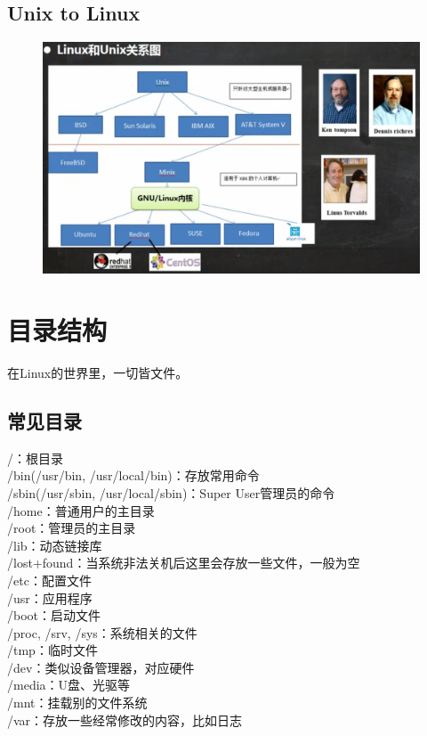 \documentclass[11pt]{article}
\begin{document}
\subsection{Unix to Linux}
\begin{figure}[htb]
    \centering
    \includegraphics[scale=0.08]{imgs/unix_linux.png}
\end{figure}


\section{目录结构}
在Linux的世界里，一切皆文件。
\subsection{常见目录}
/：根目录  \\
/bin(/usr/bin, /usr/local/bin)：存放常用命令  \\
/sbin(/usr/sbin, /usr/local/sbin)：Super User管理员的命令  \\
/home：普通用户的主目录  \\
/root：管理员的主目录  \\
/lib：动态链接库  \\
/lost+found：当系统非法关机后这里会存放一些文件，一般为空  \\
/etc：配置文件  \\
/usr：应用程序  \\
/boot：启动文件  \\
/proc, /srv, /sys：系统相关的文件  \\
/tmp：临时文件  \\
/dev：类似设备管理器，对应硬件  \\
/media：U盘、光驱等  \\
/mnt：挂载别的文件系统  \\
/var：存放一些经常修改的内容，比如日志 \\
\end{document}
